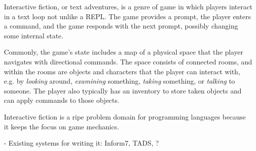 Interactive fiction, or text adventures, is a genre of game in which
players interact in a text loop not unlike a REPL. The game provides a
prompt, the player enters a command, and the game responds with the next
prompt, possibly changing some internal state.

Commonly, the game's state includes a map of a physical space that the
player navigates with directional commands. The space consists of connected
rooms, and within the rooms are objects and characters that the player can
interact with, e.g. by {\em looking} around, {\em examining} something, 
{\em taking} something, or {\em talking} to someone. The player also
typically has an inventory to store taken objects and can apply commands to
those objects.

Interactive fiction is a ripe problem domain for programming languages
because it keeps the focus on game mechanics.

- Existing systems for writing it: Inform7, TADS, ?

